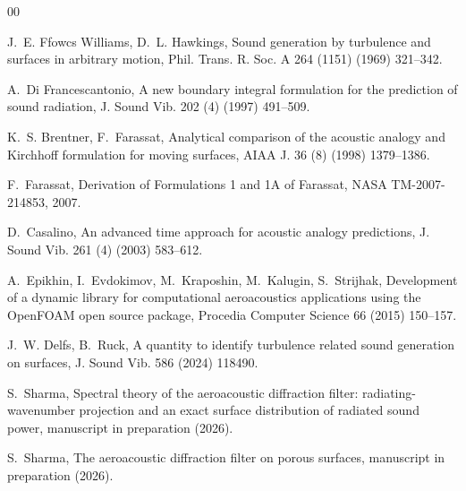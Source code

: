 \documentclass[preprint,12pt,a4paper]{elsarticle}
\begin{document}
\begin{thebibliography}{00}

 J.~E. Ffowcs Williams, D.~L. Hawkings, Sound generation by
turbulence and surfaces in arbitrary motion, Phil. Trans. R. Soc. A 264
(1151) (1969) 321--342.

 A.~Di Francescantonio, A new boundary
integral formulation for the prediction of sound radiation, J. Sound Vib.
202 (4) (1997) 491--509.

 K.~S. Brentner, F.~Farassat, Analytical comparison of
the acoustic analogy and Kirchhoff formulation for moving surfaces, AIAA J.
36 (8) (1998) 1379--1386.

 F.~Farassat, Derivation of Formulations 1 and 1A of
Farassat, NASA TM-2007-214853, 2007.

 D.~Casalino, An advanced time approach for acoustic
analogy predictions, J. Sound Vib. 261 (4) (2003) 583--612.

 A.~Epikhin, I.~Evdokimov, M.~Kraposhin, M.~Kalugin,
S.~Strijhak, Development of a dynamic library for computational aeroacoustics
applications using the OpenFOAM open source package, Procedia Computer
Science 66 (2015) 150--157.

 J.~W. Delfs, B.~Ruck, A quantity to identify turbulence
related sound generation on surfaces, J. Sound Vib. 586 (2024) 118490.

 S.~Sharma, Spectral theory of the aeroacoustic
diffraction filter: radiating-wavenumber projection and an exact surface
distribution of radiated sound power, manuscript in preparation (2026).

 S.~Sharma, The aeroacoustic diffraction filter on
porous surfaces, manuscript in preparation (2026).

\end{thebibliography}
\end{document}
